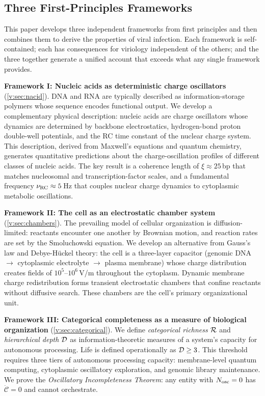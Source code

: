 \subsection{Three First-Principles Frameworks}

This paper develops three independent frameworks from first principles and then combines them to derive the properties of viral infection. Each framework is self-contained; each has consequences for viriology independent of the others; and the three together generate a unified account that exceeds what any single framework provides.

\textbf{Framework I: Nucleic acids as deterministic charge oscillators} (\cref{v:sec:nacid}). DNA and RNA are typically described as information-storage polymers whose sequence encodes functional output. We develop a complementary physical description: nucleic acids are charge oscillators whose dynamics are determined by backbone electrostatics, hydrogen-bond proton double-well potentials, and the RC time constant of the nuclear charge system. This description, derived from Maxwell's equations and quantum chemistry, generates quantitative predictions about the charge-oscillation profiles of different classes of nucleic acids. The key result is a coherence length of $\xi \approx 25$\,bp that matches nucleosomal and transcription-factor scales, and a fundamental frequency $\nu_{\mathrm{RC}} \approx 5$\,Hz that couples nuclear charge dynamics to cytoplasmic metabolic oscillations.

\textbf{Framework II: The cell as an electrostatic chamber system} (\cref{v:sec:chambers}). The prevailing model of cellular organization is diffusion-limited: reactants encounter one another by Brownian motion, and reaction rates are set by the Smoluchowski equation. We develop an alternative from Gauss's law and Debye-H\"{u}ckel theory: the cell is a three-layer capacitor (genomic DNA $\to$ cytoplasmic electrolyte $\to$ plasma membrane) whose charge distribution creates fields of $10^5$--$10^6$\,V/m throughout the cytoplasm. Dynamic membrane charge redistribution forms transient electrostatic chambers that confine reactants without diffusive search. These chambers are the cell's primary organizational unit.

\textbf{Framework III: Categorical completeness as a measure of biological organization} (\cref{v:sec:categorical}). We define \emph{categorical richness} $\mathcal{R}$ and \emph{hierarchical depth} $\mathcal{D}$ as information-theoretic measures of a system's capacity for autonomous processing. Life is defined operationally as $\mathcal{D} \geq 3$. This threshold requires three tiers of autonomous processing capacity: membrane-level quantum computing, cytoplasmic oscillatory exploration, and genomic library maintenance. We prove the \emph{Oscillatory Incompleteness Theorem}: any entity with $N_{\mathrm{osc}} = 0$ has $\dot{\mathcal{C}} = 0$ and cannot orchestrate.

